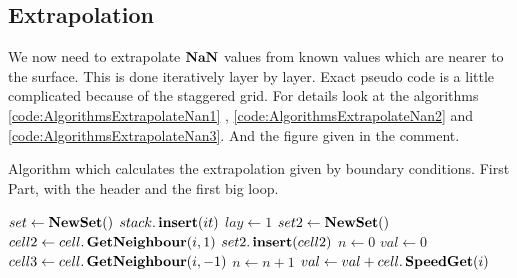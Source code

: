 \subsection{Extrapolation}

We now need to extrapolate $\mathop{\textbf{NaN}}$ values from known values which are nearer to the surface.
This is done iteratively layer by layer.
Exact pseudo code is a little complicated because of the staggered grid. For details look at the algorithms  \ref{code:AlgorithmsExtrapolateNan1}
, \ref{code:AlgorithmsExtrapolateNan2} and \ref{code:AlgorithmsExtrapolateNan3}. And the figure given in the comment.

\begin{algorithm}
\caption{Algorithm which calculates the extrapolation given by boundary conditions. First Part, with the header and the first big loop.}
\label{code:AlgorithmsExtrapolateNan1}
\begin{algorithmic}[1]
\State $set \gets \mathop{\textbf{NewSet}}()$
	\State  $stack.\mathop{\textbf{insert}}(it)$ 
	\EndIf
	\EndFor
	\State $lay \gets 1$
	\Loop
	\State $set2 \gets \mathop{\textbf{NewSet}}()$
	 
		\State $cell2 \gets cell.\mathop{\textbf{GetNeighbour}}(i,1)$ 
			 
				\State $set2.\mathop{\textbf{insert}}(cell2)$
			\EndIf
			 
			\State $n \gets 0$ 
			\State $val \gets 0$ 
			 
				 
				 
					\State $cell3 \gets cell.\mathop{\textbf{GetNeighbour}}(i,-1)$
						\State $n\gets n+1$
						\State $val \gets val+cell.\mathop{\textbf{SpeedGet}}(i)$

\end{algorithmic}
\end{algorithm}
